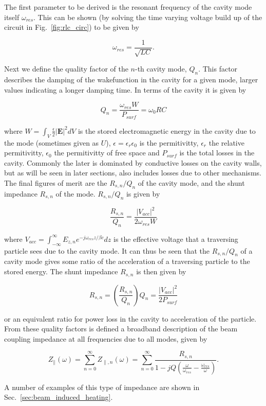 The first parameter to be derived is the resonant frequency of the cavity mode itself $\omega_{res}$. This can be shown (by solving the time varying voltage build up of the circuit in Fig.~\ref{fig:rlc_circ}) to be given by

\begin{equation}
\omega_{res} = \frac{1}{\sqrt{LC}}.
\end{equation}

Next we define the quality factor of the $n$-th cavity mode, $Q_{n}$. This factor describes the damping of the wakefunction in the cavity for a given mode, larger values indicating a longer damping time. In terms of the cavity it is given by

\begin{equation}
Q_{n} = \frac{\omega_{res} W}{P_{surf}} = \omega_{0}RC
\end{equation}

where $W = \int_{V} \frac{\epsilon}{2} \left| \mathbf{E} \right|^{2} dV$ is the stored electromagnetic energy in the cavity due to the mode (sometimes given as $U$), $\epsilon = \epsilon_{r}\epsilon_{0}$ is the permitivitty, $\epsilon_{r}$ the relative permitivitty, $\epsilon_{0}$ the permitivitty of free space and $P_{surf}$ is the total losses in the cavity. Commonly the later is dominated by conductive losses on the cavity walls, but as will be seen in later sections, also includes losses due to other mechanisms. The final figures of merit are the $R_{s, n}/Q_{n}$ of the cavity mode, and the shunt impedance $R_{s, n}$ of the mode. $R_{s, n}/Q_{n}$ is given by

\begin{equation}
\frac{R_{s, n}}{Q_{n}} = \frac{\left| V_{acc} \right|^{2}}{2 \omega_{res} W}
\end{equation}

where $V_{acc} = \int^{\infty}_{-\infty} E_{z, n} e^{-j \omega_{res} z/ \beta{}c} dz$ is the effective voltage that a traversing particle sees due to the cavity mode. It can thus be seen that the $R_{s, n}/Q_{n}$ of a cavity mode gives some ratio of the acceleration of a traversing particle to the stored energy. The shunt impedance $R_{s, n}$ is then given by

\begin{equation}
R_{s, n} = \left(  \frac{R_{s, n}}{Q_{n}} \right) Q_{n} = \frac{\left| V_{acc} \right|^{2}}{2 P_{surf}}
\end{equation}

or an equivalent ratio for power loss in the cavity to acceleration of the particle. From these quality factors is defined a broadband description of the beam coupling impedance at all frequencies due to all modes, given by

\begin{equation}
Z_{\parallel} \left( \omega \right) = \displaystyle\sum\limits_{n = 0}^{\infty} Z_{\parallel, n} \left( \omega \right) = \displaystyle\sum\limits_{n = 0}^{\infty} \frac{R_{s, n}}{1 - jQ \left( \frac{\omega}{\omega_{res}} - \frac{\omega_{res}}{\omega} \right)}.
\end{equation}

A number of examples of this type of impedance are shown in Sec.~\ref{sec:beam_induced_heating}.